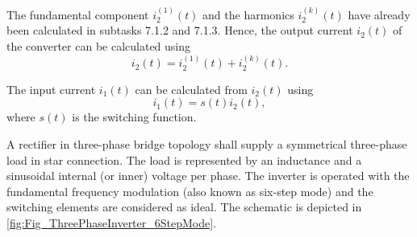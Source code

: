 
\newpage
\begin{solutionblock}
The fundamental component $i^\mathrm{(1)}_\mathrm{2}(t)$ and the harmonics $i^{(k)}_\mathrm{2}(t)$ have already been calculated in subtasks 7.1.2 and 7.1.3. Hence,
the output current $i_\mathrm{2}(t)$ of the converter can be calculated using 
\begin{equation}
    i_\mathrm{2}(t) = i^\mathrm{(1)}_\mathrm{2}(t) + i^{(k)}_\mathrm{2}(t).
    \label{7.1.2:eq:approx_i_2_harm}         
\end{equation}
\end{solutionblock} 


\begin{solutionblock}
    The input current $i_\mathrm{1}(t)$ can be calculated from $i_\mathrm{2}(t)$ using 
    \begin{equation}
        i_\mathrm{1}(t) = s(t) i_\mathrm{2}(t),
        \label{7.1.2:eq:approx_i_2_harm}         
    \end{equation}
    where $s(t)$ is the switching function.
    \end{solutionblock}








\newpage



A rectifier in three-phase bridge topology shall supply a
symmetrical three-phase load in star connection. The load is represented by an inductance and 
a sinusoidal internal (or inner) voltage per phase. The inverter is operated with the fundamental 
frequency modulation (also known as six-step mode) and the switching elements are considered as ideal. 
The schematic is depicted in \autoref{fig:Fig_ThreePhaseInverter_6StepMode}.



